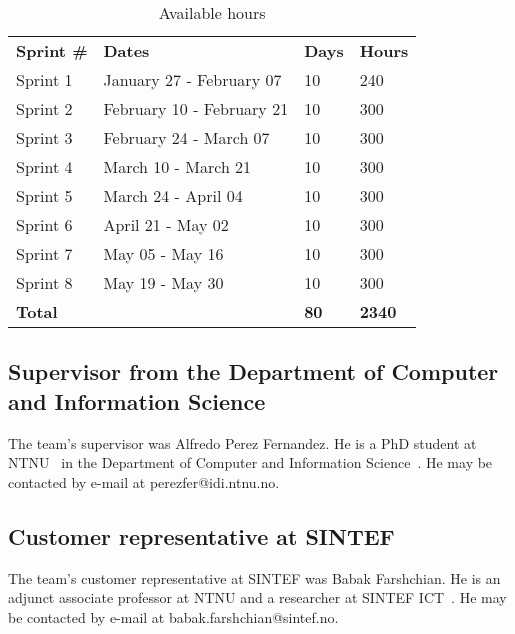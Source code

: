 \begin{table}[H]
\centering
{}
\begin{tabular}{|l|l|l|l|}
\hline
\textbf{Sprint \#} & \textbf{Dates} & \textbf{Days} & \textbf{Hours}\\
Sprint 1& January 27 - February 07 & 10  & 240 \\
Sprint 2 & February 10 - February 21 &10  & 300 \\
Sprint 3 & February 24 - March 07 &10 & 300 \\
Sprint 4 & March 10 - March 21 &10  &300 \\
Sprint 5 & March 24 - April 04 &10&  300 \\
Sprint 6 & April 21 - May 02 &10  &300 \\
Sprint 7 & May 05 - May 16 &10  &300 \\
Sprint 8 & May 19 - May 30 &10  &300 \\
\textbf{Total}&& \textbf{80}&  \textbf{2340}\\\hline
\end{tabular}
\caption{Available hours}
\label{tab:availHours}
\end{table}



\subsection{Supervisor from the Department of Computer and Information Science}
The team's supervisor was Alfredo Perez Fernandez. He is a PhD student at NTNU~\cite{ntnu} in the Department of Computer and Information Science~\cite{idi}. He may be contacted by e-mail at perezfer@idi.ntnu.no.

\subsection{Customer representative at SINTEF}
The team's customer representative at SINTEF was Babak Farshchian. He is an adjunct associate professor at NTNU and a researcher at SINTEF ICT~\cite{sintefict}. He may be contacted by e-mail at babak.farshchian@sintef.no.
